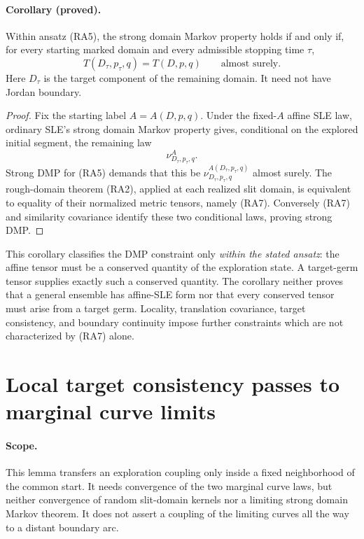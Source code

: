 \documentclass[11pt]{article}
\theoremstyle{definition}\newtheorem{definition}[theorem]{Definition}
\theoremstyle{remark}\newtheorem{remark}[theorem]{Remark}
\begin{document}
\paragraph{Corollary (proved).}
Within ansatz (RA5), the strong domain Markov property holds if and only if,
for every starting marked domain and every admissible stopping time $\tau$,
\[
 T(D_\tau,p_\tau,q)=T(D,p,q)\qquad\text{almost surely}.
 \tag{RA7}
\]
Here $D_\tau$ is the target component of the remaining domain.  It need not
have Jordan boundary.

\begin{proof}
Fix the starting label $A=A(D,p,q)$.  Under the fixed-$A$ affine SLE law,
ordinary SLE's strong domain Markov property gives, conditional on the
explored initial segment, the remaining law
\[
 \nu^A_{D_\tau,p_\tau,q}.
\]
Strong DMP for (RA5) demands that this be
$\nu^{A(D_\tau,p_\tau,q)}_{D_\tau,p_\tau,q}$ almost surely.
The rough-domain theorem (RA2), applied at each realized slit domain,
is equivalent to equality of their normalized metric tensors, namely
(RA7).  Conversely (RA7) and similarity covariance identify these two
conditional laws, proving strong DMP.
\end{proof}

This corollary classifies the DMP constraint only \emph{within the stated
ansatz}: the affine tensor must be a conserved quantity of the exploration
state.  A target-germ tensor supplies exactly such a conserved quantity.
The corollary neither proves that a general ensemble has affine-SLE form nor
that every conserved tensor must arise from a target germ.  Locality,
translation covariance, target consistency, and boundary continuity impose
further constraints which are not characterized by (RA7) alone.

\section{Local target consistency passes to marginal curve limits}
\label{sec:local-target-transfer}

\paragraph{Scope.}
This lemma transfers an exploration coupling only inside a fixed neighborhood
of the common start. It needs convergence of the two marginal curve laws, but
neither convergence of random slit-domain kernels nor a limiting strong domain
Markov theorem. It does not assert a coupling of the limiting curves all the
way to a distant boundary arc.
\end{document}
